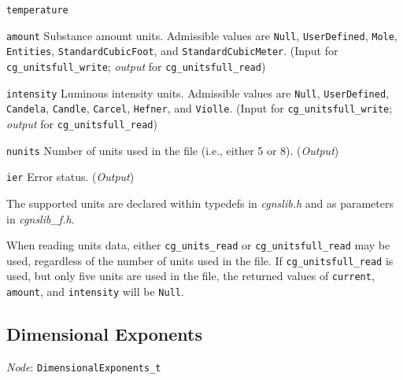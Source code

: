 \begin{Ventryi}{\texttt{temperature}}
\item [\texttt{amount}]
      Substance amount units.
      Admissible values are \texttt{Null}, \texttt{UserDefined},
      \texttt{Mole}, \texttt{Entities}, \texttt{StandardCubicFoot}, and
      \texttt{StandardCubicMeter}.
      (\textcolor{input}{Input} for \texttt{cg\_unitsfull\_write};
      \textcolor{output}{\textit{output}} for \texttt{cg\_unitsfull\_read})
\item [\texttt{intensity}]
      Luminous intensity units.
      Admissible values are \texttt{Null}, \texttt{UserDefined},
      \texttt{Candela}, \texttt{Candle}, \texttt{Carcel},
      \texttt{Hefner}, and \texttt{Violle}.
      (\textcolor{input}{Input} for \texttt{cg\_unitsfull\_write};
      \textcolor{output}{\textit{output}} for \texttt{cg\_unitsfull\_read})
\item [\texttt{nunits}]
      Number of units used in the file (i.e., either 5 or 8).
      (\textcolor{output}{\textit{Output}})
\item [\texttt{ier}]
      Error status.
      (\textcolor{output}{\textit{Output}})
\end{Ventryi}

The supported units are declared within typedefs in \textit{cgnslib.h}
and as parameters in \textit{cgnslib\_f.h}.

When reading units data, either \texttt{cg\_units\_read} or
\texttt{cg\_unitsfull\_read} may be used, regardless of the number of
units used in the file.
If \texttt{cg\_unitsfull\_read} is used, but only five units are used
in the file, the returned values of \texttt{current}, \texttt{amount},
and \texttt{intensity} will be \texttt{Null}.

\newpage
\subsection{Dimensional Exponents}
\label{s:dimensionalexponents}

\noindent
\textit{Node}: \texttt{DimensionalExponents\_t}

